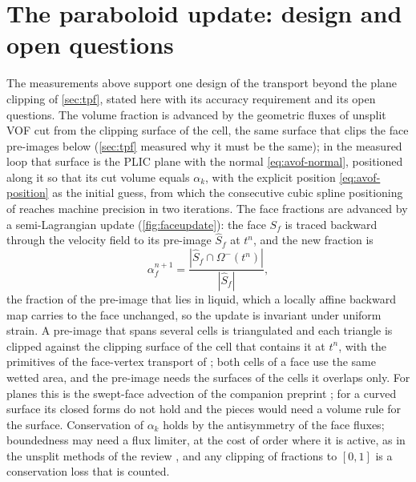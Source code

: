 \documentclass[preprint,12pt]{elsarticle}
\newcommand{\Sfhat}{\hat{S}_f}
\begin{document}
\section{The paraboloid update: design and open questions}
\label{sec:transport}



The measurements above support one design of the transport beyond the plane clipping of \cref{sec:tpf}, stated here with its accuracy requirement and its open questions. The volume fraction is advanced by the geometric fluxes of unsplit VOF cut from the clipping surface of the cell, the same surface that clips the face pre-images below (\cref{sec:tpf} measured why it must be the same); in the measured loop that surface is the PLIC plane with the normal \cref{eq:avof-normal}, positioned along it so that its cut volume equals $\alpha_k$, with the explicit position \cref{eq:avof-position} as the initial guess, from which the consecutive cubic spline positioning of \citet{Maric2021CCS} reaches machine precision in two iterations. The face fractions are advanced by a semi-Lagrangian update (\cref{fig:faceupdate}): the face $S_f$ is traced backward through the velocity field to its pre-image $\Sfhat$ at $t^n$, and the new fraction is
\begin{equation}
\alpha_f^{n+1} = \frac{|\Sfhat \cap \Omega^-(t^n)|}{|\Sfhat|},
\label{eq:face-update}
\end{equation}
the fraction of the pre-image that lies in liquid, which a locally affine backward map carries to the face unchanged, so the update is invariant under uniform strain. A pre-image that spans several cells is triangulated and each triangle is clipped against the clipping surface of the cell that contains it at $t^n$, with the primitives of the face-vertex transport of \citet{MaricMarschallBothe2018}; both cells of a face use the same wetted area, and the pre-image needs the surfaces of the cells it overlaps only. For planes this is the swept-face advection of the companion preprint \citep{MaricSweptAdvection2026}; for a curved surface its closed forms do not hold and the pieces would need a volume rule for the surface. Conservation of $\alpha_k$ holds by the antisymmetry of the face fluxes; boundedness may need a flux limiter, at the cost of order where it is active, as in the unsplit methods of the review \citep{MaricKotheBothe2020}, and any clipping of fractions to $[0, 1]$ is a conservation loss that is counted.
\end{document}

